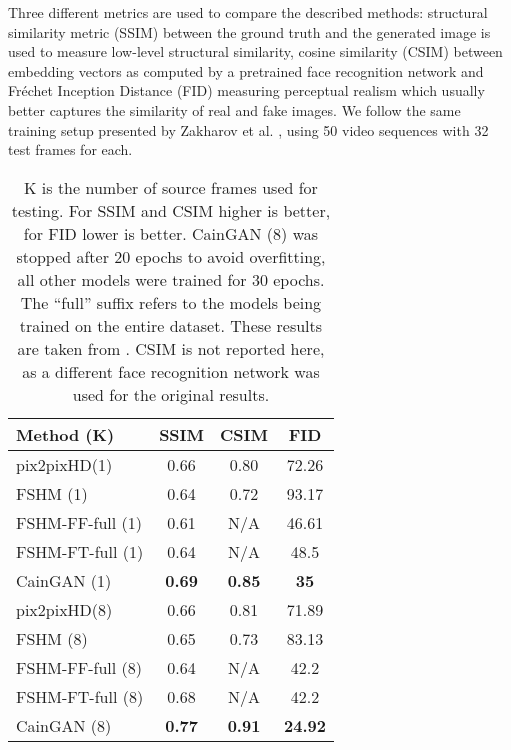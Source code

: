 \documentclass[11pt,a4paper]{article}
\begin{document}
Three different metrics are used to compare the described methods: structural similarity metric (SSIM) between the ground truth and the generated image is used to measure low-level structural similarity, cosine similarity (CSIM) between embedding vectors as computed by a pretrained face recognition network and Fr\'echet Inception Distance (FID) \cite{heusel2017gans} measuring perceptual realism which usually better captures the similarity of real and fake images. We follow the same training setup presented by Zakharov et al. \cite{zakharov2019fewshot}, using 50 video sequences with 32 test frames for each. 

\setlength{\tabcolsep}{1em}
\begin{table}[t]
\centering
\begin{tabular}{l c c c}
     Method (K) & SSIM  & CSIM  & FID   \\
     \hline
     pix2pixHD(1) & 0.66 & 0.80 & 72.26 \\ 
     FSHM (1) & 0.64 & 0.72 & 93.17 \\
     FSHM-FF-full (1) & 0.61 & N/A & 46.61 \\
     FSHM-FT-full (1) & 0.64 & N/A & 48.5 \\
     CainGAN (1) & \textbf{0.69} & \textbf{0.85} & \textbf{35} \\
     \hline
     pix2pixHD(8) & 0.66 & 0.81 & 71.89 \\ 
     FSHM (8) & 0.65 & 0.73 & 83.13 \\
     FSHM-FF-full (8) & 0.64 & N/A & 42.2 \\
     FSHM-FT-full (8) & 0.68 & N/A & 42.2 \\
     CainGAN (8) & \textbf{0.77} & \textbf{0.91} & \textbf{24.92} \\
     \hline
\end{tabular}
\caption{K is the number of source frames used for testing. For SSIM and CSIM higher is better, for FID lower is better. CainGAN (8) was stopped after 20 epochs to avoid overfitting, all other models were trained for 30 epochs. The ``full'' suffix refers to the models being trained on the entire dataset. These results are taken from \cite{zakharov2019fewshot}. CSIM is not reported here, as a different face recognition network was used for the original results.
}
\label{tab:exp}
\end{table}
\end{document}
